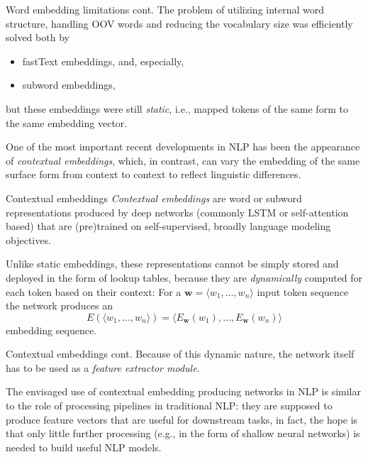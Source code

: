 \documentclass[style=upen, size=14pt]{powerdot}
\newcommand{\gold}{\color{arany}}
\theoremstyle{definition}
\begin{document}
\begin{slide}[toc=]{Word embedding limitations cont.}
  The problem of utilizing internal word structure, handling OOV words and
  reducing the vocabulary size was efficiently solved both by
  \begin{itemize}
  \item fastText embeddings, and, especially,
  \item subword embeddings,
  \end{itemize}
  but these embeddings were still \emph{\gold static}, i.e., mapped tokens
  of the same form to the same embedding vector.

  One of the most important recent developments in NLP has been the appearance
  of \emph{\gold contextual embeddings}, which, in contrast, can vary the
  embedding of the same surface form from context to context to reflect
  linguistic differences.
\end{slide}

\begin{slide}[toc=Contextual embeddings]{Contextual embeddings}
  \emph{\gold Contextual embeddings} are word or subword representations
  produced by deep networks (commonly LSTM or self-attention based) that are
  (pre)trained on self-supervised, broadly language modeling objectives.
  \bigskip

  Unlike static embeddings, these representations cannot be simply stored and
  deployed in the form of lookup tables, because they are \emph{dynamically}
  computed for each token based on their context: For a
  $\mathbf{w} = \langle w_1,\dots ,w_n \rangle$ input token sequence the network
  produces an
  $$
  E(\langle w_1,\dots ,w_n \rangle) = \langle
  E_\mathbf{w}(w_1),\dots,E_\mathbf{w}(w_n)\rangle
  $$
  embedding sequence.
\end{slide}

\begin{slide}[toc=]{Contextual embeddings cont.}
  Because of this dynamic nature, the network itself has to be used as a
  \emph{\gold feature extractor module}.\bigskip

  The envisaged use of contextual embedding producing networks in NLP is similar
  to the role of processing pipelines in traditional NLP: they are supposed to
  produce feature vectors that are useful for downstream tasks, in fact, the
  hope is that only little further processing (e.g., in the form of shallow
  neural networks) is needed to build useful NLP models.
\end{slide}
\end{document}
